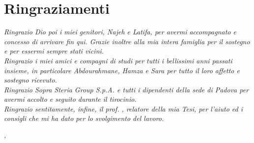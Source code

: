 
\cleardoublepage
{}
{}



\bigskip

\begingroup
\let\clearpage\relax
\let\cleardoublepage\relax
\let\cleardoublepage\relax

\chapter*{Ringraziamenti}


\noindent \textit{Ringrazio Dio poi i miei genitori, Najeh e Latifa, per avermi accompagnato e concesso di arrivare fin qui. Grazie inoltre alla mia intera famiglia per il sostegno e per essermi sempre stati vicini.}\\

\noindent \textit{Ringrazio i miei amici e compagni di studi per tutti i bellissimi anni passati insieme, in particolare Abdourahmane, Hamza e Sara per tutto il loro affetto e sostegno ricevuto.}\\

\noindent \textit{Ringrazio Sopra Steria Group S.p.A. e tutti i dipendenti della sede di Padova per avermi accolto e seguito durante il tirocinio.}\\

\noindent \textit{Ringrazio sentitamente, infine, il prof. \myProf, relatore della mia Tesi, per
l'aiuto ed i consigli che mi ha dato per lo svolgimento del lavoro.}\\

\bigskip

\noindent\textit{\myLocation, \myTime}
\hfill \myName

\endgroup

\blankpage
\blankpage

